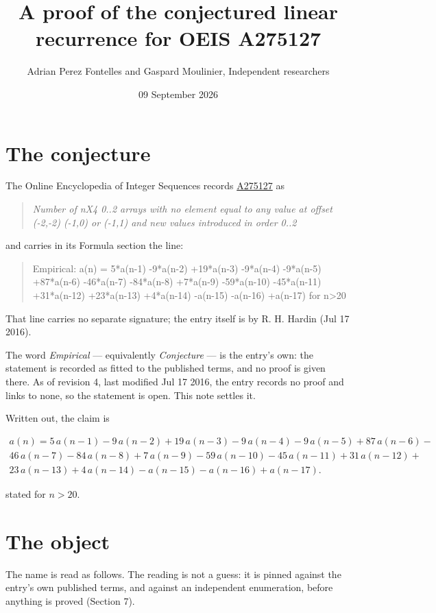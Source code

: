 \documentclass[11pt]{article}
\title{A proof of the conjectured linear recurrence for OEIS A275127}
\author{Adrian Perez Fontelles and Gaspard Moulinier, Independent researchers}
\date{09 September 2026}
\theoremstyle{definition}
\begin{document}
\maketitle
\section{The conjecture}

The Online Encyclopedia of Integer Sequences records \href{https://oeis.org/A275127}{A275127} as

\begin{quote}\itshape Number of nX4 0..2 arrays with no element equal to any value at offset (-2,-2) (-1,0) or (-1,1) and new values introduced in order 0..2\end{quote}

and carries in its Formula section the line:

\begin{quote}\ttfamily Empirical: a(n) = 5*a(n-1) -9*a(n-2) +19*a(n-3) -9*a(n-4) -9*a(n-5) +87*a(n-6) -46*a(n-7) -84*a(n-8) +7*a(n-9) -59*a(n-10) -45*a(n-11) +31*a(n-12) +23*a(n-13) +4*a(n-14) -a(n-15) -a(n-16) +a(n-17) for n>20\end{quote}

That line carries no separate signature; the entry itself is by R. H. Hardin (Jul 17 2016).

The word {\itshape Empirical} --- equivalently {\itshape Conjecture} --- is the entry's own: the statement is recorded as fitted to the published terms, and no proof is given there. As of revision 4, last modified Jul 17 2016, the entry records no proof and links to none, so the statement is open. This note settles it.

Written out, the claim is

\begin{multline*} a(n) = 5\,a(n-1) - 9\,a(n-2) + 19\,a(n-3) - 9\,a(n-4) - 9\,a(n-5) + 87\,a(n-6) - \\ 46\,a(n-7) - 84\,a(n-8) + 7\,a(n-9) - 59\,a(n-10) - 45\,a(n-11) + 31\,a(n-12) + \\ 23\,a(n-13) + 4\,a(n-14) - a(n-15) - a(n-16) + a(n-17). \end{multline*}

stated for $n > 20$.

\section{The object}

The name is read as follows. The reading is not a guess: it is pinned against the entry's own published terms, and against an independent enumeration, before anything is proved (Section 7).
\end{document}
